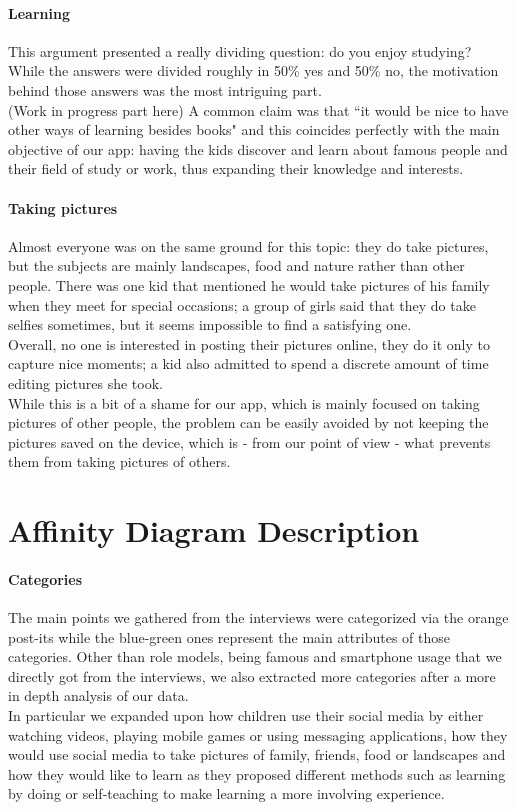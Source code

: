 \documentclass[12pt]{scrartcl}
\begin{document}
		\paragraph{Learning} This argument presented a really dividing question: do you enjoy studying? While the answers were divided roughly in 50\% yes and 50\% no, the motivation behind those answers was the most intriguing part.\\
		(Work in progress part here)
		A common claim was that ``it would be nice to have other ways of learning besides books" and this coincides perfectly with the main objective of our app: having the kids discover and learn about famous people and their field of study or work, thus expanding their knowledge and interests.
		
		\paragraph{Taking pictures} Almost everyone was on the same ground for this topic: they do take pictures, but the subjects are mainly landscapes, food and nature rather than other people. There was one kid that mentioned he would take pictures of his family when they meet for special occasions; a group of girls said that they do take selfies sometimes, but it seems impossible to find a satisfying one.\\
		Overall, no one is interested in posting their pictures online, they do it only to capture nice moments; a kid also admitted to spend a discrete amount of time editing pictures she took.\\
		While this is a bit of a shame for our app, which is mainly focused on taking pictures of other people, the problem can be easily avoided by not keeping the pictures saved on the device, which is - from our point of view - what prevents them from taking pictures of others.
		

\section*{Affinity Diagram Description}

	\paragraph{Categories} The main points we gathered from the interviews were categorized via
the orange post-its while the blue-green ones represent the main attributes of those categories. 
Other than role models, being famous and smartphone usage that we directly got from the 
interviews, we also extracted more categories after a more in depth analysis of our data.\\
In particular we expanded upon how children use their social media by either watching videos, 
playing mobile games or using messaging applications, how they would use social media to take 
pictures of family, friends, food or landscapes and how they would like to learn as they proposed 
different methods such as learning by doing or self-teaching to make learning a more involving 
experience.
\end{document}
